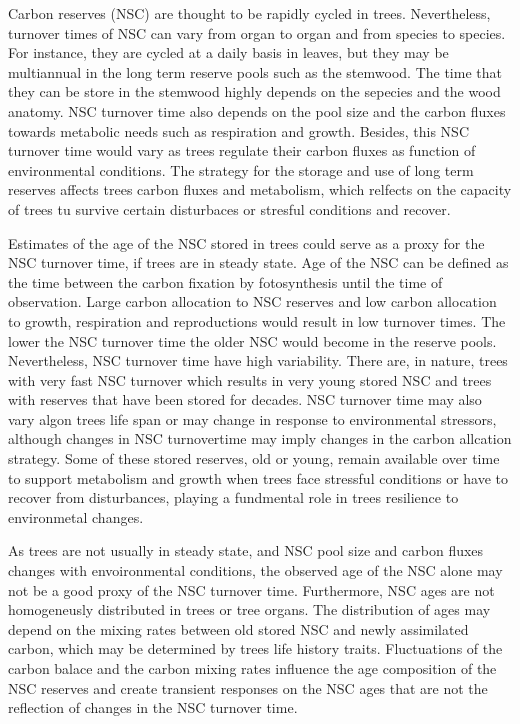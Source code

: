 \documentclass{article}
\begin{document}
Carbon reserves (NSC) are thought to be rapidly cycled in trees. 
Nevertheless, turnover times of NSC can vary from organ to organ and from species to species.
For instance, they are cycled at a daily basis in leaves, but they may be multiannual in the long term reserve pools such as the stemwood. 
The time that they can be store in the stemwood highly depends on the sepecies and the wood anatomy. 
NSC turnover time also depends on the pool size and the carbon fluxes towards metabolic needs such as respiration and growth.
Besides, this NSC turnover time would vary as trees regulate their carbon fluxes as function of environmental conditions. 
The strategy for the storage and use of long term reserves affects trees carbon fluxes and metabolism, which relfects on the capacity of trees tu survive certain disturbaces or stresful conditions and recover. 

Estimates of the age of the NSC stored in trees could serve as a proxy for the NSC turnover time, if trees are in steady state. 
Age of the NSC can be defined as the time between the carbon fixation by fotosynthesis until the time of observation. 
Large carbon allocation to NSC reserves and low carbon allocation to growth, respiration and reproductions would result in low turnover times.
The lower the NSC turnover time the older NSC would become in the reserve pools.
Nevertheless, NSC turnover time have high variability.
There are, in nature, trees with very fast NSC turnover which results in very young stored NSC and trees with reserves that have been stored for decades. 
NSC turnover time may also vary algon trees life span or may change in response to environmental stressors, although changes in NSC turnovertime may imply changes in the carbon allcation strategy. 
Some of these stored reserves, old or young, remain available over time to support metabolism and growth when trees face stressful conditions or have to recover from disturbances, playing a fundmental role in trees resilience to environmetal changes. 

As trees are not usually in steady state, and NSC pool size and carbon fluxes changes with envoironmental conditions, the observed age of the NSC alone may not be a good proxy of the NSC turnover time. 
Furthermore, NSC ages are not homogeneusly distributed in trees or tree organs.
The distribution of ages may depend on the mixing rates between old stored NSC and newly assimilated carbon, which may be determined by trees life history traits. 
Fluctuations of the carbon balace and the carbon mixing rates influence the age composition of the NSC reserves and create transient responses on the NSC ages that are not the reflection of changes in the NSC turnover time. 
\end{document}
